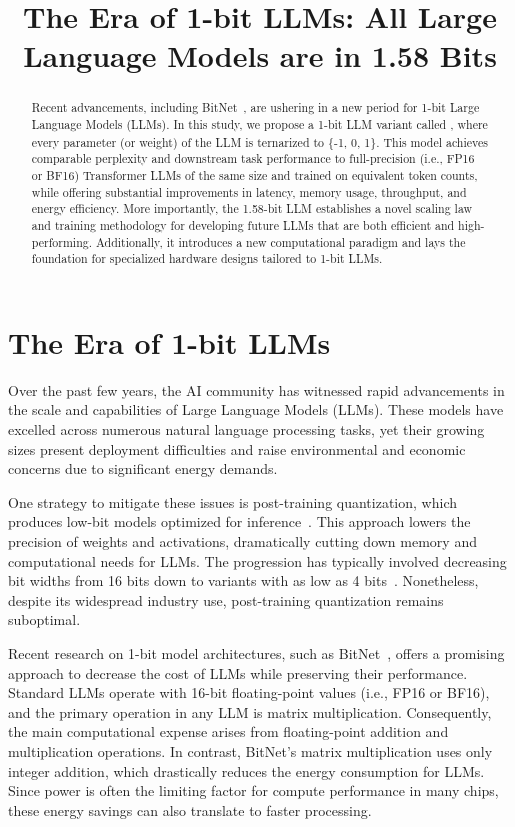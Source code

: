 \title{The Era of 1-bit LLMs: All Large Language Models are in 1.58 Bits}

\begin{abstract}
Recent advancements, including BitNet~\cite{bitnet}, are ushering in a new period for 1-bit Large Language Models (LLMs). In this study, we propose a 1-bit LLM variant called \textbf{}, where every parameter (or weight) of the LLM is ternarized to \{-1, 0, 1\}. This model achieves comparable perplexity and downstream task performance to full-precision (i.e., FP16 or BF16) Transformer LLMs of the same size and trained on equivalent token counts, while offering substantial improvements in latency, memory usage, throughput, and energy efficiency. More importantly, the 1.58-bit LLM establishes a novel scaling law and training methodology for developing future LLMs that are both efficient and high-performing. Additionally, it introduces a new computational paradigm and lays the foundation for specialized hardware designs tailored to 1-bit LLMs.
\end{abstract}

\section{The Era of 1-bit LLMs}

Over the past few years, the AI community has witnessed rapid advancements in the scale and capabilities of Large Language Models (LLMs). These models have excelled across numerous natural language processing tasks, yet their growing sizes present deployment difficulties and raise environmental and economic concerns due to significant energy demands.

One strategy to mitigate these issues is post-training quantization, which produces low-bit models optimized for inference~\cite{smoothquant, gptq, quip, quip_sharp}. This approach lowers the precision of weights and activations, dramatically cutting down memory and computational needs for LLMs. The progression has typically involved decreasing bit widths from 16 bits down to variants with as low as 4 bits~\cite{gptq, awq}. Nonetheless, despite its widespread industry use, post-training quantization remains suboptimal.

Recent research on 1-bit model architectures, such as BitNet~\cite{bitnet}, offers a promising approach to decrease the cost of LLMs while preserving their performance. Standard LLMs operate with 16-bit floating-point values (i.e., FP16 or BF16), and the primary operation in any LLM is matrix multiplication. Consequently, the main computational expense arises from floating-point addition and multiplication operations. In contrast, BitNet’s matrix multiplication uses only integer addition, which drastically reduces the energy consumption for LLMs. Since power is often the limiting factor for compute performance in many chips, these energy savings can also translate to faster processing.


